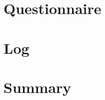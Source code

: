 \documentclass[letterpaper, 11pt]{article}
\title{\deliv{\srs}{Interview Log}}
\date{\datesrs}
\begin{document}
\maketitle
\tableofcontents
\thispagestyle{fancy}

\begin{flushleft}


\section{Questionnaire}





\section{Log}





\section{Summary}



\end{flushleft}
\end{document}
